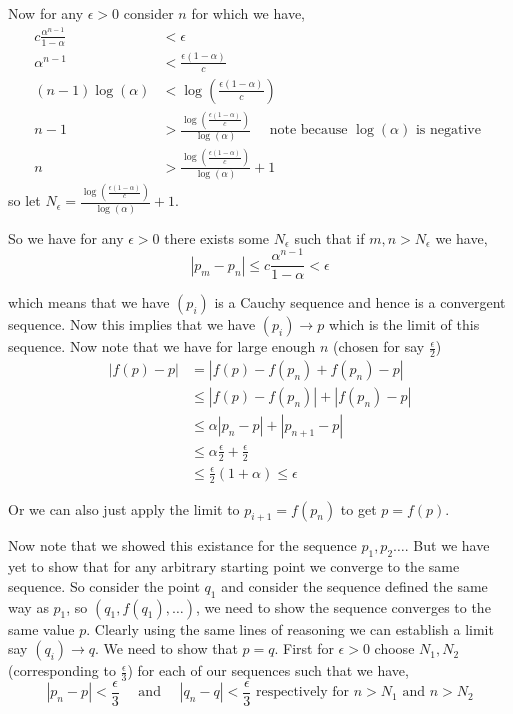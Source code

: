 \documentclass[a4paper]{article}
\begin{document}
Now for any $\epsilon > 0$ consider $n$ for which we have, 
\begin{align*}
  c\frac{\alpha^{n - 1}}{1 - \alpha} &< \epsilon\\
  \alpha^{n - 1} &< \frac{\epsilon(1 - \alpha)}{c}\\
  (n - 1) \log(\alpha) &<  \log \left(\frac{\epsilon(1 - \alpha)}{c} \right)\\
  n - 1 &> \frac{ \log \left(\frac{\epsilon(1 - \alpha)}{c} \right)}{\log(\alpha) } \quad \text{ note because $\log(\alpha)$ is negative }\\
  n  &> \frac{ \log \left(\frac{\epsilon(1 - \alpha)}{c} \right)}{\log(\alpha) }  + 1
\end{align*}
so let $N_{\epsilon} = \frac{ \log \left(\frac{\epsilon(1 - \alpha)}{c} \right)}{\log(\alpha) }  + 1$.
\vspace{1em}

So we have for any $\epsilon > 0$ there exists some $N_{\epsilon}$ such that if $m, n > N_{\epsilon}$ we have, 
\[
  |p_m - p_n| \le c \frac{\alpha^{n - 1}}{1 - \alpha} < \epsilon
\]

which means that we have $(p_i)$ is a Cauchy sequence and hence is a convergent sequence. Now this implies that we have $(p_i) \to p$ which is the limit of this sequence. Now note that we have for large enough $n$ (chosen for say $\frac{\epsilon}{2}$)
\begin{align*}
  |f(p) - p| &= |f(p) - f(p_n) + f(p_n) - p|\\
             &\le |f(p) - f(p_n)| + |f(p_n) - p|\\ 
             &\le  \alpha |p_n - p| + |p_{n + 1} - p|\\
             &\le \alpha \frac{\epsilon}{2} + \frac{\epsilon}{2}\\
             &\le \frac{\epsilon}{2} (1 + \alpha) \le \epsilon
\end{align*}

Or we can  also just apply the limit to $p_{i + 1} = f(p_n)$ to get $p = f(p)$.

\vspace{1em}

Now note that we showed this existance for the sequence $p_{1}, p_{2} \dots$. But we have yet to show that for any arbitrary starting point we converge to the same sequence. So consider the point $q_{1}$ and consider the sequence defined the same way as $p_{1}$, so $(q_{1}, f(q_{1}), \dots)$, we need to show the sequence converges to the same value $p$. Clearly using the same lines of reasoning we can establish a limit say $(q_i) \to q$. We need to show that $p = q$. First for  $\epsilon > 0$ choose $N_{1}, N_{2}$ (corresponding to $\frac{\epsilon}{3}$) for each of our sequences such that we have, 
\[
  |p_n - p| < \frac{\epsilon}{3} \quad \text{ and } \quad |q_n - q| < \frac{\epsilon}{3} \text{ respectively for $n > N_{1}$  and $n > N_{2}$}
\]
\end{document}

